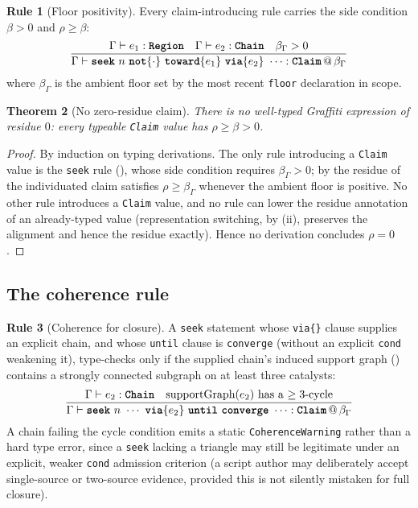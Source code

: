 \documentclass[11pt,twocolumn,a4paper]{article}
\theoremstyle{thmstyle}
\newtheorem{theorem}{Theorem}[section]
\theoremstyle{definition}
\newtheorem{rulename}[theorem]{Rule}
\theoremstyle{remark}
\newcommand{\flo}{\beta}
\newcommand{\res}{\rho}
\newcommand{\tm}[1]{\textbf{\texttt{#1}}}
\begin{document}
\begin{rulename}[Floor positivity]
\label{rule:positivity}
Every claim-introducing rule carries the side condition $\flo>0$ and
$\res\ge\flo$:
\[
\frac{\Gamma\vdash e_1:\tm{Region}\quad
      \Gamma\vdash e_2:\tm{Chain}\quad \flo_{\Gamma}>0}
     {\Gamma\vdash \tm{seek}\ n\ \tm{not}\{\cdot\}\ \tm{toward}\{e_1\}\
      \tm{via}\{e_2\}\ \cdots : \tm{Claim}\,@\,\flo_{\Gamma}}
\]
where $\flo_{\Gamma}$ is the ambient floor set by the most recent
\texttt{floor} declaration in scope.
\end{rulename}

\begin{theorem}[No zero-residue claim]
\label{thm:no-zero}
There is no well-typed Graffiti expression of residue $0$: every
typeable \texttt{Claim} value has $\res\ge\flo>0$.
\end{theorem}

\begin{proof}
By induction on typing derivations. The only rule introducing a
\texttt{Claim} value is the \texttt{seek} rule (),
whose side condition requires $\flo_{\Gamma}>0$; by \Cref{thm:floor} the
residue of the individuated claim satisfies $\res\ge\flo_{\Gamma}$
whenever the ambient floor is positive. No other rule introduces a
\texttt{Claim} value, and no rule can lower the residue annotation of an
already-typed value (representation switching, by
(ii), preserves the alignment and hence the
residue exactly). Hence no derivation concludes $\res=0$.
\end{proof}

\subsection{The coherence rule}

\begin{rulename}[Coherence for closure]
\label{rule:coherence}
A \texttt{seek} statement whose \texttt{via\{\}} clause supplies an
explicit chain, and whose \texttt{until} clause is \texttt{converge}
(without an explicit \texttt{cond} weakening it), type-checks only if the
supplied chain's induced support graph (\Cref{def:support}) contains a
strongly connected subgraph on at least three catalysts:
\[
\frac{\Gamma\vdash e_2:\tm{Chain}\quad
      \text{supportGraph}(e_2)\text{ has a $\ge3$-cycle}}
     {\Gamma\vdash \tm{seek}\ n\ \cdots\ \tm{via}\{e_2\}\ \tm{until}\
      \tm{converge}\ \cdots : \tm{Claim}\,@\,\flo_{\Gamma}}
\]
A chain failing the cycle condition emits a static
\texttt{CoherenceWarning} rather than a hard type error, since a
\texttt{seek} lacking a triangle may still be legitimate under an
explicit, weaker \texttt{cond} admission criterion (a script author may
deliberately accept single-source or two-source evidence, provided this is
not silently mistaken for full closure).
\end{rulename}
\end{document}

